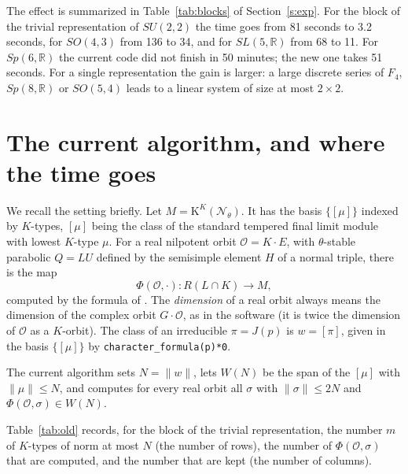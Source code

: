 \documentclass[11pt,leqno]{article}
\theoremstyle{definition}
\numberwithin{equation}{section}
\newcommand{\K}{\mathrm{K}}
\newcommand{\nil}{\mathcal N}
\newcommand{\Ob}{\mathcal O}
\newcommand{\R}{\mathbb R}
\newcommand{\at}[1]{\texttt{#1}}
\begin{document}
The effect is summarized in Table~\ref{tab:blocks} of Section~\ref{s:exp}.
For the block of the trivial representation of $SU(2,2)$ the time goes from
81 seconds to 3.2 seconds, for $SO(4,3)$ from 136 to 34, and for
$SL(5,\R)$ from 68 to 11.  For $Sp(6,\R)$ the current code did not finish
in 50 minutes; the new one takes 51 seconds.  For a single representation
the gain is larger: a large discrete series of $F_4$, $Sp(8,\R)$ or $SO(5,4)$
leads to a linear system of size at most $2\times 2$.

\section{The current algorithm, and where the time goes}
\label{s:cost}

We recall the setting briefly.  Let $M=\K^K(\nil_\theta)$.  It has the basis
$\{[\mu]\}$ indexed by $K$-types, $[\mu]$ being the class of the standard
tempered final limit module with lowest $K$-type $\mu$.  For a real nilpotent
orbit $\Ob=K\cdot E$, with $\theta$-stable parabolic $Q=LU$ defined by the
semisimple element $H$ of a normal triple, there is the map
\[
\Phi(\Ob,\cdot)\colon R(L\cap K)\longrightarrow M ,
\]
computed by the formula of \cite[Section~6]{KN}.  The \emph{dimension} of a real orbit
always means the dimension of the complex orbit $G\cdot\Ob$, as in the
software (it is twice the dimension of $\Ob$ as a $K$-orbit).  The class of an
irreducible $\pi=J(p)$ is $w=[\pi]$, given in the basis $\{[\mu]\}$ by
\at{character\_formula(p)*0}.

The current algorithm sets $N=\|w\|$, lets $W(N)$ be the span of the $[\mu]$
with $\|\mu\|\le N$, and computes for every real orbit all $\sigma$ with
$\|\sigma\|\le 2N$ and $\Phi(\Ob,\sigma)\in W(N)$.

Table~\ref{tab:old} records, for the block of the trivial representation, the
number $m$ of $K$-types of norm at most $N$ (the number of rows), the number
of $\Phi(\Ob,\sigma)$ that are computed, and the number that are kept (the
number of columns).
\end{document}
